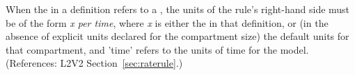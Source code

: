 When the  in a \RateRule definition refers to a
\Compartment, the units of the rule's right-hand side must be of the form
\emph{x per time}, where \emph{x} is either the  in that
\Compartment definition, or (in the absence of explicit units declared for
the compartment size) the default units for that compartment, and 'time'
refers to the units of time for the model.  (References: L2V2
Section~\ref{sec:raterule}.)
